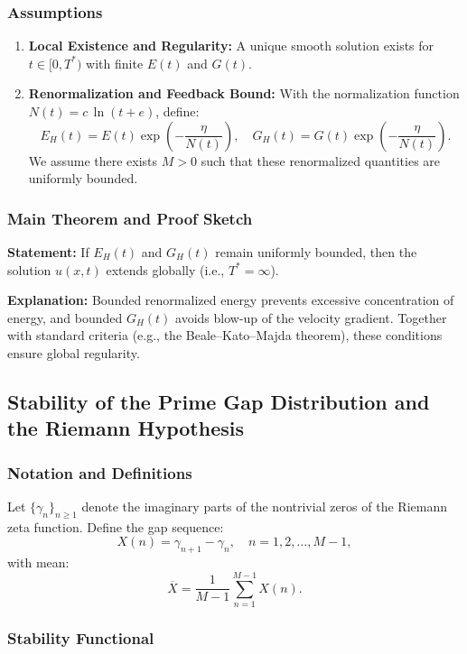 \documentclass[11pt]{article}
\begin{document}
\subsubsection{Assumptions}

\begin{enumerate}
    \item \textbf{Local Existence and Regularity:} A unique smooth solution exists for $t \in [0,T^*)$ with finite $E(t)$ and $G(t)$.
    \item \textbf{Renormalization and Feedback Bound:} With the normalization function $N(t)=c\,\ln(t+e)$, define:
    \[
    E_H(t)=E(t)\exp\left(-\frac{\eta}{N(t)}\right), \quad G_H(t)=G(t)\exp\left(-\frac{\eta}{N(t)}\right).
    \]
    We assume there exists $M>0$ such that these renormalized quantities are uniformly bounded.
\end{enumerate}

\subsubsection{Main Theorem and Proof Sketch}

\textbf{Statement:} If $E_H(t)$ and $G_H(t)$ remain uniformly bounded, then the solution $u(x,t)$ extends globally (i.e., $T^*=\infty$).

\textbf{Explanation:} Bounded renormalized energy prevents excessive concentration of energy, and bounded $G_H(t)$ avoids blow-up of the velocity gradient. Together with standard criteria (e.g., the Beale--Kato--Majda theorem), these conditions ensure global regularity.

\subsection{Stability of the Prime Gap Distribution and the Riemann Hypothesis}

\subsubsection{Notation and Definitions}

Let $\{\gamma_n\}_{n\ge1}$ denote the imaginary parts of the nontrivial zeros of the Riemann zeta function. Define the gap sequence:
\[
X(n)=\gamma_{n+1}-\gamma_n, \quad n=1,2,\ldots, M-1,
\]
with mean:
\[
\overline{X}=\frac{1}{M-1}\sum_{n=1}^{M-1} X(n).
\]

\subsubsection{Stability Functional}
\end{document}
